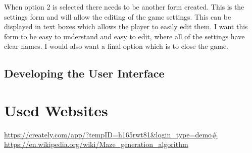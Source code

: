 \documentclass[12pt]{article}
\begin{document}
When option 2 is selected there needs to be another form created. This is the settings form and will allow the editing of the game settings. This can be displayed in text boxes which allows the player to easily edit them. I want this form to be easy to understand and easy to edit, where all of the settings have clear names. I would also want a final option which is to close the game.



\subsection{Developing the User Interface}

\subsubsection{}

\section{Used Websites}






























\url{https://creately.com/app/?tempID=h165rwt81&login_type=demo#}\newline
\url{https://en.wikipedia.org/wiki/Maze_generation_algorithm}
\end{document}

